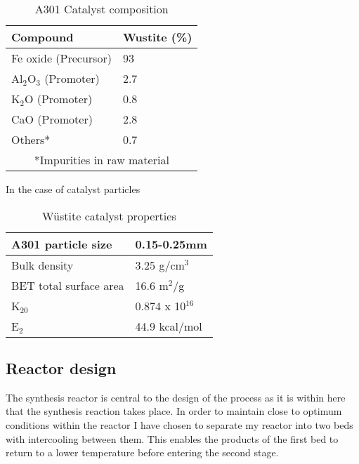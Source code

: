 {\begin{table}[!htbp]
\begin{center}
\caption{A301 Catalyst composition}
\begin{tabular}{ |p{3.5cm}|p{2.05cm}|  }

	\hline
	Compound & Wustite (\%)\\
	\hline
	Fe oxide (Precursor) & 93\\
	\hline
	Al$_2$O$_3$ (Promoter)&   2.7\\
	\hline
	K$_2$O (Promoter)&0.8 \\
	\hline
	CaO    (Promoter)&2.8 \\
	\hline
	Others*& 0.7\\
	\hline
		\multicolumn{2}{|c|}{*Impurities in raw material} \\

	\hline
\end{tabular}
\end{center}
\end{table}

In the case of catalyst particles 


\begin{table}[!htbp]
	\begin{center} 
	\caption{W\"{u}stite catalyst properties \cite{Pernicone2003}}
	\begin{tabular}{ |p{4cm}|p{3cm}|  }
	\hline
	A301 particle size & 0.15-0.25mm\\
	\hline
	Bulk density & 3.25 g/cm$^3$\\
	\hline
	BET total surface area & 16.6 m$^2$/g\\
	\hline
	K$_{20}$&  0.874 x 10$^{16}$\\
	\hline
	E$_2$ &44.9 kcal/mol \\
	\hline
	

	\end{tabular}
	\end{center}
\end{table}


\subsection{Reactor design}
The synthesis reactor is central to the design of the process as it is within here that the synthesis reaction takes place. In order to maintain close to optimum conditions within the reactor I have chosen to separate my reactor into two beds with intercooling between them. This enables the products of the first bed to return to a lower temperature before entering the second stage.

}
